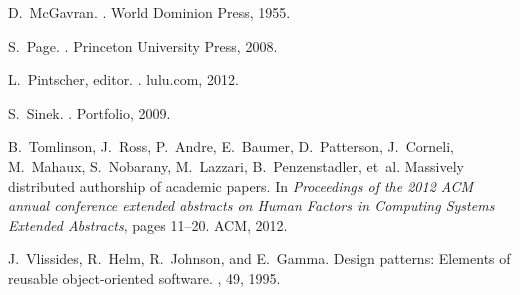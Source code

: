 \documentclass{acm_proc_article-sp}
\begin{document}
\begin{thebibliography}{10}
D.~McGavran.
.
\newblock World Dominion Press, 1955.

S.~Page.
.
\newblock Princeton University Press, 2008.

L.~Pintscher, editor.
.
\newblock lulu.com, 2012.

S.~Sinek.
.
\newblock Portfolio, 2009.

B.~Tomlinson, J.~Ross, P.~Andre, E.~Baumer, D.~Patterson, J.~Corneli,
  M.~Mahaux, S.~Nobarany, M.~Lazzari, B.~Penzenstadler, et~al.
\newblock Massively distributed authorship of academic papers.
\newblock In {\em Proceedings of the 2012 ACM annual conference extended
  abstracts on Human Factors in Computing Systems Extended Abstracts}, pages
  11--20. ACM, 2012.

J.~Vlissides, R.~Helm, R.~Johnson, and E.~Gamma.
\newblock Design patterns: Elements of reusable object-oriented software.
, 49, 1995.

\end{thebibliography}
\end{document}
